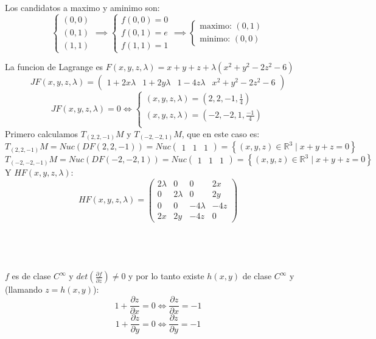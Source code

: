 \documentclass{article}
\newcommand\pdv[2]{\frac{\partial#1}{\partial#2}}
\begin{document}
Los candidatos a maximo y aminimo son:
\[
\begin{cases}
(0,0) \\
(0,1) \\
(1, 1)
\end{cases}
\implies
\begin{cases}
f(0, 0) = 0 \\
f(0, 1) = e \\
f(1, 1) = 1
\end{cases}
\implies
\begin{cases}
\text{maximo: } (0, 1) \\
\text{minimo: } (0, 0)
\end{cases}
\]

\newpage

La funcion de Lagrange es $F(x, y, z, \lambda) = x + y + z + \lambda(x^2 + y^2 - 2z^2 - 6)$
\[
JF(x, y, z, \lambda) = \begin{pmatrix}
1 + 2x\lambda & 1 + 2y\lambda & 1 - 4z\lambda & x^2 + y^2 -2z^2 - 6
\end{pmatrix}
\]
\[
JF(x, y, z, \lambda) = 0 \iff
\begin{cases}
(x, y, z, \lambda) = \left(2,2,-1,\frac{1}{4} \right) \\
(x, y, z, \lambda) = \left(-2,-2,1,\frac{-1}{4} \right) \\
\end{cases}
\]
Primero calculamos $T_{(2,2,-1)}M$ y $T_{(-2,-2,1)}M$, que en este caso es:
\[
T_{(2,2,-1)}M = Nuc(DF(2,2,-1)) = Nuc \begin{pmatrix}
 1 & 1 & 1
\end{pmatrix} = \left\{ (x, y, z) \in \mathbb{R}^3 \mid x + y + z = 0\right\}
\]
\[
T_{(-2,-2,-1)}M = Nuc(DF(-2,-2,1)) = Nuc \begin{pmatrix}
 1 & 1 & 1
\end{pmatrix} = \left\{ (x, y, z) \in \mathbb{R}^3 \mid x + y + z = 0 \right\}
\]
Y $HF(x,  y, z, \lambda)$:
\[
HF(x, y, z, \lambda) = \begin{pmatrix}
2\lambda & 0 & 0 & 2x \\
0 & 2\lambda & 0 & 2y \\
0 & 0 & -4\lambda & -4z \\
2x & 2y & -4z & 0
\end{pmatrix}
\]
\\ \\ \\ \\
$f$ es de clase $C^\infty$ y $det\left( \pdv{f}{z} \right) \neq 0$ y por lo tanto existe $h(x, y)$
de clase $C^\infty$ y (llamando $z = h(x, y)$):
\[
1 + \pdv{z}{x} = 0 \iff \pdv{z}{x} = -1
\]
\[
1 + \pdv{z}{y} = 0 \iff \pdv{z}{y} = -1
\]
\end{document}
